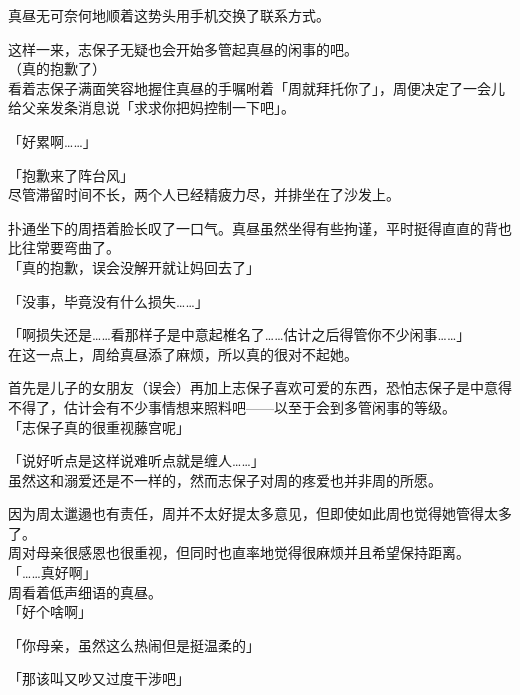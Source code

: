 真昼无可奈何地顺着这势头用手机交换了联系方式。

这样一来，志保子无疑也会开始多管起真昼的闲事的吧。\\

（真的抱歉了）\\

看着志保子满面笑容地握住真昼的手嘱咐着「周就拜托你了」，周便决定了一会儿给父亲发条消息说「求求你把妈控制一下吧」。\\

\vspace{2\baselineskip}

「好累啊……」

「抱歉来了阵台风」\\

尽管滞留时间不长，两个人已经精疲力尽，并排坐在了沙发上。

扑通坐下的周捂着脸长叹了一口气。真昼虽然坐得有些拘谨，平时挺得直直的背也比往常要弯曲了。\\

「真的抱歉，误会没解开就让妈回去了」

「没事，毕竟没有什么损失……」

「啊损失还是……看那样子是中意起椎名了……估计之后得管你不少闲事……」\\

在这一点上，周给真昼添了麻烦，所以真的很对不起她。

首先是儿子的女朋友（误会）再加上志保子喜欢可爱的东西，恐怕志保子是中意得不得了，估计会有不少事情想来照料吧——以至于会到多管闲事的等级。\\

「志保子真的很重视藤宫呢」

「说好听点是这样说难听点就是缠人……」\\

虽然这和溺爱还是不一样的，然而志保子对周的疼爱也并非周的所愿。

因为周太邋遢也有责任，周并不太好提太多意见，但即使如此周也觉得她管得太多了。\\

周对母亲很感恩也很重视，但同时也直率地觉得很麻烦并且希望保持距离。\\

「……真好啊」\\

周看着低声细语的真昼。\\

「好个啥啊」

「你母亲，虽然这么热闹但是挺温柔的」

「那该叫又吵又过度干涉吧」

